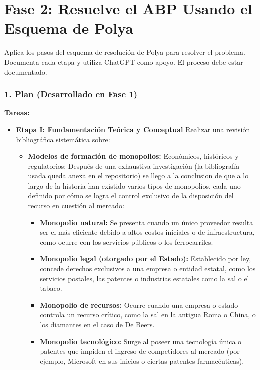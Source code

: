\documentclass[a4paper,12pt]{article}
\begin{document}
\section*{Fase 2: Resuelve el ABP Usando el Esquema de Polya}

Aplica los pasos del esquema de resolución de Polya para resolver el problema. Documenta cada etapa y utiliza ChatGPT como apoyo. El proceso debe estar documentado. 


\subsubsection*{1. Plan (Desarrollado en Fase 1)}
    \textbf{Tareas:}
\begin{itemize}
    \item \textbf{Etapa I: Fundamentación Teórica y Conceptual} Realizar una revisión bibliográfica sistemática sobre:
    \begin{itemize}
        \item \textbf{Modelos de formación de monopolios:} Económicos, históricos y regulatorios: Después de una exhaustiva investigación (la bibliografía usada queda anexa en el repositorio) se llego a la conclusion de que a lo largo de la historia han existido varios tipos de monopolios, cada uno definido por cómo se logra el control exclusivo de la disposición del recurso en cuestión al mercado:
\begin{itemize}
    \item \textbf{Monopolio natural:} Se presenta cuando un único proveedor resulta ser el más eficiente debido a altos costos iniciales o de infraestructura, como ocurre con los servicios públicos o los ferrocarriles.

    \item \textbf{Monopolio legal (otorgado por el Estado):} Establecido por ley, concede derechos exclusivos a una empresa o entidad estatal, como los servicios postales, las patentes o industrias estatales como la sal o el tabaco.

    \item \textbf{Monopolio de recursos:} Ocurre cuando una empresa o estado controla un recurso crítico, como la sal en la antigua Roma o China, o los diamantes en el caso de De Beers.

    \item \textbf{Monopolio tecnológico:} Surge al poseer una tecnología única o patentes que impiden el ingreso de competidores al mercado (por ejemplo, Microsoft en sus inicios o ciertas patentes farmacéuticas).


\end{itemize}
\end{itemize}
\end{itemize}
\end{document}
